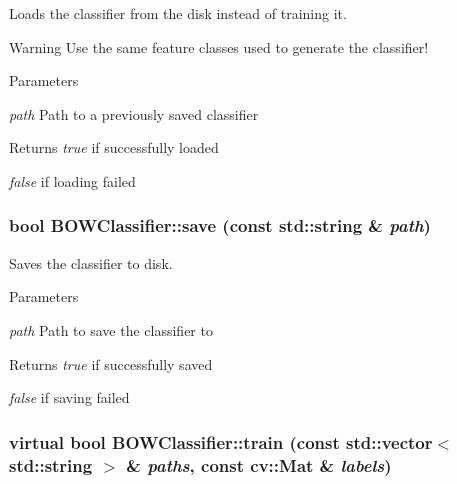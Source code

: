 Loads the classifier from the disk instead of training it.

\begin{DoxyWarning}{Warning}
Use the same feature classes used to generate the classifier!
\end{DoxyWarning}

\begin{DoxyParams}{Parameters}
\item[{\em path}]Path to a previously saved classifier \end{DoxyParams}
\begin{DoxyReturn}{Returns}
{\itshape true\/} if successfully loaded\par
 {\itshape false\/} if loading failed 
\end{DoxyReturn}
\hypertarget{classBOWClassifier_a474e4942af78f65125f15ad13924a3c4}{
\subsubsection[{save}]{\setlength{\rightskip}{0pt plus 5cm}bool BOWClassifier::save (const std::string \& {\em path})}}
\label{classBOWClassifier_a474e4942af78f65125f15ad13924a3c4}


Saves the classifier to disk. 


\begin{DoxyParams}{Parameters}
\item[{\em path}]Path to save the classifier to \end{DoxyParams}
\begin{DoxyReturn}{Returns}
{\itshape true\/} if successfully saved\par
 {\itshape false\/} if saving failed 
\end{DoxyReturn}
\hypertarget{classBOWClassifier_a8a00f5cadf166f361a411d5a4e67b4d6}{
\subsubsection[{train}]{\setlength{\rightskip}{0pt plus 5cm}virtual bool BOWClassifier::train (const std::vector$<$ std::string $>$ \& {\em paths}, \/  const cv::Mat \& {\em labels})}}
\label{classBOWClassifier_a8a00f5cadf166f361a411d5a4e67b4d6}


